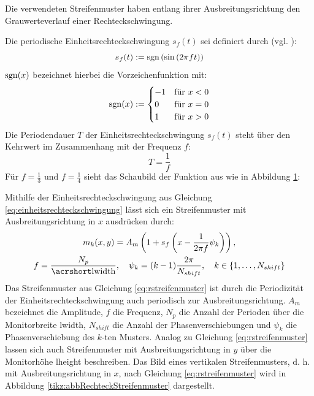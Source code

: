 Die verwendeten Streifenmuster haben entlang ihrer Ausbreitungsrichtung den Grauwerteverlauf einer Rechteckschwingung.

\noindent
Die periodische Einheitsrechteckschwingung $s_f(t)$ sei definiert durch (vgl. \cite{squareWave}):
%
\begin{equation} \label{eq:einheitsrechteckschwingung}
	s_f(t) := \operatorname{sgn} \left( \sin \left(2 \pi f t \right) \right)
\end{equation}
%
$\operatorname{sgn}(x)$ bezeichnet hierbei die Vorzeichenfunktion mit:
%
\begin{equation*}
	\operatorname{sgn}(x) := 
		\begin{cases}
	      -1 & \text{für $x < 0$}\\
	      0 & \text{für $x = 0$}\\
	      1 & \text{für $x > 0$}
	    \end{cases} 
\end{equation*}
%
Die Periodendauer $T$ der Einheitsrechteckschwingung $s_f(t)$ steht über den Kehrwert im Zusammenhang mit der Frequenz $f$:
\begin{equation*}
	T = \dfrac{1}{f}
\end{equation*}
Für $f = \tfrac{1}{3}$ und $f = \tfrac{1}{4}$ sieht das Schaubild der Funktion aus wie in Abbildung \ref{tikz:abbRechteckschwingung}:
{
	\begin{figure}[H]
		\centering
		
		\label{tikz:abbRechteckschwingung}
	\end{figure}
}

\noindent
Mithilfe der Einheitsrechteckschwingung aus Gleichung \ref{eq:einheitsrechteckschwingung} lässt sich ein Streifenmuster mit Ausbreitungsrichtung in $x$ ausdrücken durch:
\begin{equation} \label{eq:rstreifenmuster}
	\begin{gathered}
		m_k(x,y) = A_m 
		\left(
			1 + s_f \left(x - \dfrac{1}{2\pi f} \psi_k \right)
		\right),\\
		f = \dfrac{N_p}{\acrshortmath{lwidth}},
		\quad
		\psi_k = (k - 1)\dfrac{2\pi}{N_{shift}},
		\quad
		k \in \lbrace 1,\ldots,N_{shift}\rbrace 
	\end{gathered}
\end{equation}
%
Das Streifenmuster aus Gleichung \ref{eq:rstreifenmuster} ist durch die Periodizität der Einheitsrechteckschwingung auch periodisch zur Ausbreitungsrichtung.
$A_m$ bezeichnet die Amplitude, $f$ die Frequenz, $N_p$ die Anzahl der Perioden über die Monitorbreite \acrshort{lwidth}, $N_{shift}$ die Anzahl der Phasenverschiebungen und $\psi_k$ die Phasenverschiebung des $k$-ten Musters.
Analog zu Gleichung \ref{eq:rstreifenmuster} lassen sich auch Streifenmuster mit Ausbreitungsrichtung in $y$ über die Monitorhöhe \acrshort{lheight} beschreiben.
Das Bild eines vertikalen Streifenmusters, d. h. mit Ausbreitungsrichtung in $x$, nach Gleichung \ref{eq:rstreifenmuster} wird in Abbildung \ref{tikz:abbRechteckStreifenmuster} dargestellt.


